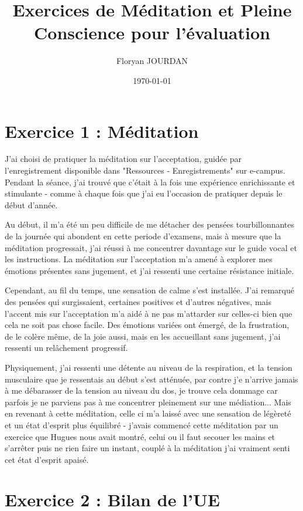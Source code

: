 \documentclass[a4paper,12pt]{article}
\title{Exercices de Méditation et Pleine Conscience pour l'évaluation}
\author{Floryan JOURDAN}
\date{\today}
\begin{document}
\maketitle

\section*{Exercice 1 : Méditation}

J'ai choisi de pratiquer la méditation sur l'acceptation, guidée par l'enregistrement disponible dans "Ressources - Enregistrements" sur e-campus. Pendant la séance, j'ai trouvé que c'était à la fois une expérience enrichissante et stimulante - comme à chaque fois que j'ai eu l'occasion de pratiquer depuis le début d'année. 

Au début, il m'a été un peu difficile de me détacher des pensées tourbillonnantes de la journée qui abondent en cette periode d'examens, mais à mesure que la méditation progressait, j'ai réussi à me concentrer davantage sur le guide vocal et les instructions. La méditation sur l'acceptation m'a amené à explorer mes émotions présentes sans jugement, et j'ai ressenti une certaine résistance initiale.

Cependant, au fil du temps, une sensation de calme s'est installée. J'ai remarqué des pensées qui surgissaient, certaines positives et d'autres négatives, mais l'accent mis sur l'acceptation m'a aidé à ne pas m'attarder sur celles-ci bien que cela ne soit pas chose facile. Des émotions variées ont émergé, de la frustration, de le colère même, de la joie aussi, mais en les accueillant sans jugement, j'ai ressenti un relâchement progressif.

Physiquement, j'ai ressenti une détente au niveau de la respiration, et la tension musculaire que je ressentais au début s'est atténuée, par contre j'e n'arrive jamais à me débarasser de la tension au niveau du dos, je trouve cela dommage car parfois je ne parviens pas à me concentrer pleinement sur une médiation... Mais en revenant à cette méditation, celle ci m'a laissé avec une sensation de légèreté et un état d'esprit plus équilibré - j'avais commencé cette méditation par un exercice que Hugues nous avait montré, celui ou il faut secouer les mains et s'arrêter puis ne rien faire un instant, couplé à la méditation j'ai vraiment senti cet état d'esprit apaisé.

\section*{Exercice 2 : Bilan de l’UE}
\end{document}
